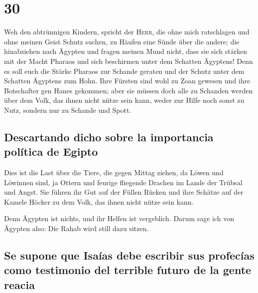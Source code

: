 \hypertarget{section-29}{%
\section{30}\label{section-29}}

 Weh den abtrünnigen Kindern, spricht der \textsc{Herr},
die ohne mich ratschlagen und ohne meinen Geist Schutz suchen, zu Häufen
eine Sünde über die andere;  die hinabziehen nach Ägypten
und fragen meinen Mund nicht, dass sie sich stärken mit der Macht
Pharaos und sich beschirmen unter dem Schatten Ägyptens! 
Denn es soll euch die Stärke Pharaos zur Schande geraten und der Schutz
unter dem Schatten Ägyptens zum Hohn.  Ihre Fürsten sind
wohl zu Zoan gewesen und ihre Botschafter gen Hanes gekommen;
 aber sie müssen doch alle zu Schanden werden über dem
Volk, das ihnen nicht nütze sein kann, weder zur Hilfe noch sonst zu
Nutz, sondern nur zu Schande und Spott.

\hypertarget{descartando-dicho-sobre-la-importancia-poluxedtica-de-egipto}{%
\subsection{Descartando dicho sobre la importancia política de
Egipto}\label{descartando-dicho-sobre-la-importancia-poluxedtica-de-egipto}}

 Dies ist die Last über die Tiere, die gegen Mittag
ziehen, da Löwen und Löwinnen sind, ja Ottern und feurige fliegende
Drachen im Lande der Trübsal und Angst. Sie führen ihr Gut auf der
Füllen Rücken und ihre Schätze auf der Kamele Höcker zu dem Volk, das
ihnen nicht nütze sein kann.

 Denn Ägypten ist nichts, und ihr Helfen ist vergeblich.
Darum sage ich von Ägypten also: Die Rahab wird still dazu sitzen.

\hypertarget{se-supone-que-isauxedas-debe-escribir-sus-profecuxedas-como-testimonio-del-terrible-futuro-de-la-gente-reacia}{%
\subsection{Se supone que Isaías debe escribir sus profecías como
testimonio del terrible futuro de la gente
reacia}\label{se-supone-que-isauxedas-debe-escribir-sus-profecuxedas-como-testimonio-del-terrible-futuro-de-la-gente-reacia}}

